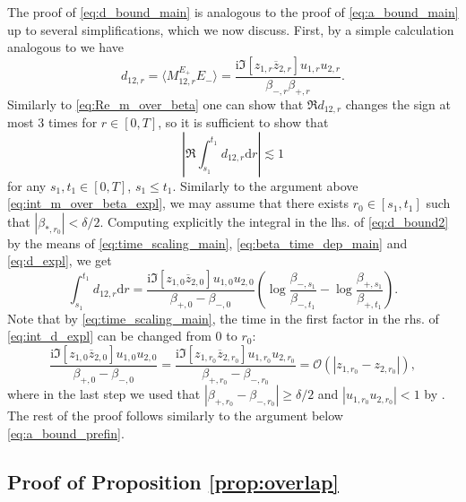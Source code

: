 \documentclass[10pt]{amsart}
\numberwithin{equation}{section}
\newcommand{\dif}{\mathrm{d}}
\newcommand{\ii}{\mathrm{i}}
\begin{document}
The proof of \eqref{eq:d_bound_main} is analogous to the proof of \eqref{eq:a_bound_main} up to several simplifications, which we now discuss. First, by a simple calculation analogous to \cite[Eq. (A.14)]{univ_extr} we have
\begin{equation}
d_{12,r}=\langle M_{12,r}^{E_+}E_-\rangle = \frac{\ii \Im \left[z_{1,r}\overline{z}_{2,r}\right] u_{1,r}u_{2,r}}{\beta_{-,r}\beta_{+,r}}.
\label{eq:d_expl}
\end{equation} 
Similarly to \eqref{eq:Re_m_over_beta} one can show that $\Re d_{12,r}$ changes the sign at most 3 times for $r\in [0,T]$, so it is sufficient to show that
\begin{equation}
\left\vert\Re\int_{s_1}^{t_1}d_{12,r}\dif r\right\vert\lesssim 1
\label{eq:d_bound2}
\end{equation}
for any $s_1,t_1\in [0,T]$, $s_1\le t_1$. Similarly to the argument above \eqref{eq:int_m_over_beta_expl}, we may assume that there exists $r_0\in [s_1,t_1]$ such that $|\beta_{*,r_0}|<\delta/2$. Computing explicitly the integral in the lhs. of \eqref{eq:d_bound2} by the means of \eqref{eq:time_scaling_main}, \eqref{eq:beta_time_dep_main} and \eqref{eq:d_expl}, we get
\begin{equation}
\int_{s_1}^{t_1}d_{12,r}\dif r = \frac{\ii \Im \left[z_{1,0}\overline{z}_{2,0}\right] u_{1,0}u_{2,0}}{\beta_{+,0}-\beta_{-,0}}\left(\log \frac{\beta_{-,s_1}}{\beta_{-,t_1}}-\log \frac{\beta_{+,s_1}}{\beta_{+,t_1}}\right).
\label{eq:int_d_expl}
\end{equation}
Note that by \eqref{eq:time_scaling_main}, the time in the first factor in the rhs. of \eqref{eq:int_d_expl} can be changed from 0 to $r_0$:
\begin{equation*}
\frac{\ii \Im \left[z_{1,0}\overline{z}_{2,0}\right] u_{1,0}u_{2,0}}{\beta_{+,0}-\beta_{-,0}} = \frac{\ii \Im \left[z_{1,r_0}\overline{z}_{2,r_0}\right] u_{1,r_0}u_{2,r_0}}{\beta_{+,r_0}-\beta_{-,r_0}} = \mathcal{O}(|z_{1,r_0}-z_{2,r_0}|),
\end{equation*}
where in the last step we used that $|\beta_{+,r_0}-\beta_{-,r_0}|\ge \delta/2$ and $|u_{1,r_0}u_{2,r_0}|< 1$ by \cite[Eq. (3.5)]{macroCLT_real}. The rest of the proof follows similarly to the argument below \eqref{eq:a_bound_prefin}.


\subsection{Proof of Proposition \ref{prop:overlap}}\label{app:overlap}
\end{document}
